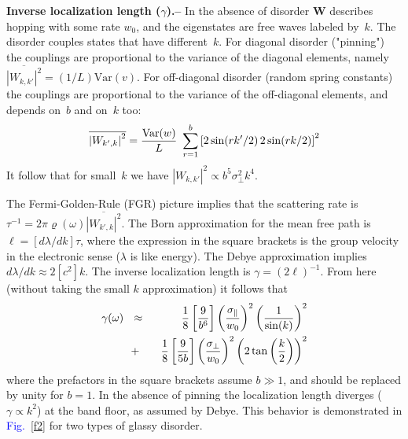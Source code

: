 \documentclass[onecolumn,fleqn,notitlepage,secnumarabic]{revtex4}
\newcommand{\Fig}[1]{\textcolor{blue}{Fig.}\!\!~\ref{#1}}
\newcommand{\be}[1]{\begin{eqnarray}\ifthenelse{#1=-1}{\nonumber}{\ifthenelse{#1=0}{}{\label{e#1}}}}
\newcommand{\ee}{\end{eqnarray}}
\newcommand{\beq}{\be{1}}
\newcommand{\eeq}{\ee}
\newcommand{\sect}[1]{{\bf #1.-- }}
\begin{document}
\sect{Inverse localization length ($\gamma$)}\label{sec:gamma}
%
In the absence of disorder $\bm{W}$ describes hopping 
with some rate $w_0$, and the eigenstates are free waves labeled by~$k$. 
%
The disorder couples states that have different~$k$. 
For diagonal disorder ("pinning") the couplings are proportional to the 
variance of the diagonal elements, 
namely ${ \overline{|W_{k,k'}|^2} = (1/L)\text{Var}(v)}$.
%
For off-diagonal disorder (random spring constants) 
the  couplings are proportional to the variance  of 
the off-diagonal elements, and depends on~$b$ and on~$k$ too:
%
\beq
\overline{\left|W_{k',k}\right|^2}  =  \frac{\text{Var}(w)}{L} \ \sum_{r=1}^{b} \left[2\sin(rk'/2) \, 2\sin(rk/2)\right]^2 
\eeq
%
It follow that for small~$k$ we have ${|W_{k,k'}|^2 \propto b^5 \sigma_{\perp}^2 k^4}$. 

The Fermi-Golden-Rule (FGR) picture implies that 
the scattering rate is ${\tau^{-1}= 2\pi \varrho(\omega) \overline{\left|W_{k',k}\right|^2}}$. 
%
The Born approximation for the mean free path is ${\ell=[d\lambda/dk]\tau}$, 
where the expression in the square brackets is the group velocity 
in the electronic sense ($\lambda$ is like energy). 
The Debye approximation implies $d\lambda/dk \approx 2[c^2]k$.
% 
The inverse localization length is $\gamma=(2\ell)^{-1}$. 
From here (without taking the small $k$ approximation) it follows that 
%
\beq \label{FGRv}
\gamma(\omega) \ \ &\approx& \ \ 
\frac{1}{8}\left[\frac{9}{b^6}\right]\left(\frac{\sigma_{\parallel}}{w_0}\right)^2  \left(\frac{1}{\sin(k)}\right)^2
\\ \label{FGRw} &+& \ \ 
\frac{1}{8}\left[\frac{9}{5b}\right]\left(\frac{\sigma_{\perp}}{w_0}\right)^2  \left( 2\tan\left(\frac{k}{2}\right) \right)^2
\eeq
%
where the prefactors in the square brackets assume ${b\gg1}$, and should be replaced by unity for ${b=1}$.
In the absence of pinning the localization length diverges ($\gamma \propto k^2$) 
at the band floor, as assumed by Debye. This behavior is demonstrated in \Fig{f2} 
for two types of glassy disorder. 
\end{document}

